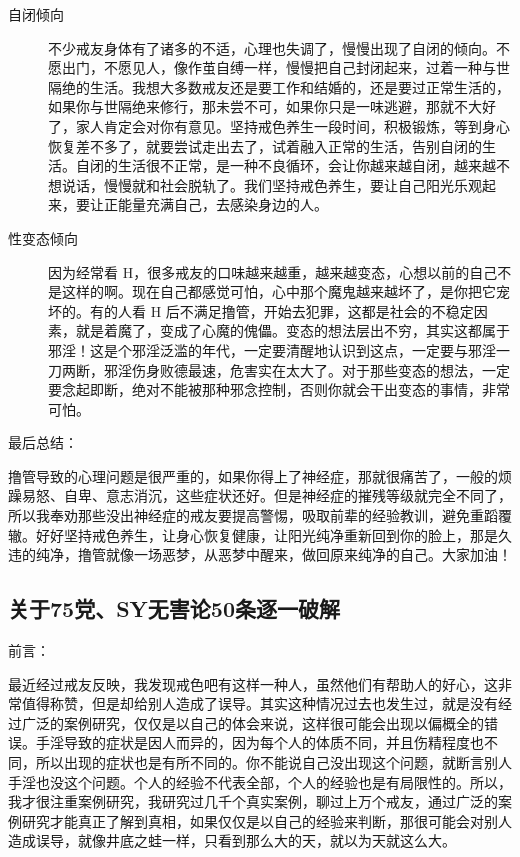 \begin{description}
    \item[自闭倾向] 不少戒友身体有了诸多的不适，心理也失调了，慢慢出现了自闭的倾向。不愿出门，不愿见人，像作茧自缚一样，慢慢把自己封闭起来，过着一种与世隔绝的生活。我想大多数戒友还是要工作和结婚的，还是要过正常生活的，如果你与世隔绝来修行，那未尝不可，如果你只是一味逃避，那就不大好了，家人肯定会对你有意见。坚持戒色养生一段时间，积极锻炼，等到身心恢复差不多了，就要尝试走出去了，试着融入正常的生活，告别自闭的生活。自闭的生活很不正常，是一种不良循环，会让你越来越自闭，越来越不想说话，慢慢就和社会脱轨了。我们坚持戒色养生，要让自己阳光乐观起来，要让正能量充满自己，去感染身边的人。
    \item[性变态倾向] 因为经常看 H，很多戒友的口味越来越重，越来越变态，心想以前的自己不是这样的啊。现在自己都感觉可怕，心中那个魔鬼越来越坏了，是你把它宠坏的。有的人看 H 后不满足撸管，开始去犯罪，这都是社会的不稳定因素，就是着魔了，变成了心魔的傀儡。变态的想法层出不穷，其实这都属于邪淫！这是个邪淫泛滥的年代，一定要清醒地认识到这点，一定要与邪淫一刀两断，邪淫伤身败德最速，危害实在太大了。对于那些变态的想法，一定要念起即断，绝对不能被那种邪念控制，否则你就会干出变态的事情，非常可怕。
\end{description}

最后总结：

撸管导致的心理问题是很严重的，如果你得上了神经症，那就很痛苦了，一般的烦躁易怒、自卑、意志消沉，这些症状还好。但是神经症的摧残等级就完全不同了，所以我奉劝那些没出神经症的戒友要提高警惕，吸取前辈的经验教训，避免重蹈覆辙。好好坚持戒色养生，让身心恢复健康，让阳光纯净重新回到你的脸上，那是久违的纯净，撸管就像一场恶梦，从恶梦中醒来，做回原来纯净的自己。大家加油！

\subsection{关于75党、SY无害论50条逐一破解}

前言：

最近经过戒友反映，我发现戒色吧有这样一种人，虽然他们有帮助人的好心，这非常值得称赞，但是却给别人造成了误导。其实这种情况过去也发生过，就是没有经过广泛的案例研究，仅仅是以自己的体会来说，这样很可能会出现以偏概全的错误。手淫导致的症状是因人而异的，因为每个人的体质不同，并且伤精程度也不同，所以出现的症状也是有所不同的。你不能说自己没出现这个问题，就断言别人手淫也没这个问题。个人的经验不代表全部，个人的经验也是有局限性的。所以，我才很注重案例研究，我研究过几千个真实案例，聊过上万个戒友，通过广泛的案例研究才能真正了解到真相，如果仅仅是以自己的经验来判断，那很可能会对别人造成误导，就像井底之蛙一样，只看到那么大的天，就以为天就这么大。

